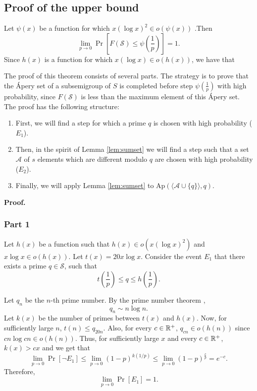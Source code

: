 \subsection{Proof of the upper bound} 
\begin{lemma}\label{lem:upperbound}
    Let $\psi(x)$ be a function for which $x(\log x)^2 \in o(\psi(x))$ .Then
    \[\lim_{p \to 0}\Pr\left[F(\mathcal{S}) \leq \psi\left(\frac{1}{p}\right)\right] = 1.\] 
    Since $h(x)$ is a function for which $x(\log x) \in o(h(x))$, we have that
\end{lemma}

\par The proof of this theorem consists of several parts. The strategy is to prove that the Ápery set of a subsemigroup of $S$ is completed before step $\psi\left(\frac{1}{p}\right)$ with high probability, since $F(\mathcal{S})$ is less than the maximum element of this Ápery set. The proof has the following structure: 
\begin{enumerate}
\item First, we will find a step for which a prime $q$ is chosen with high probability ($E_1$). 
\item Then, in the spirit of Lemma \ref{lem:sumset} we will find a step such that a set $\mathcal{A}$ of $s$ elements which are different modulo $q$ are chosen with high probability ($E_2$). 
\item Finally, we will apply Lemma \ref{lem:sumset} to $\mathrm{Ap}(\langle \mathcal{A} \cup \{q\}\rangle, q)$.
\end{enumerate}
\textbf{Proof. }
\subsubsection*{Part 1} 
Let \(h(x)\) be a function such that \(h(x) \in o(x (\log x)^2)\) and \(x\log x \in o(h(x))\). Let $t(x) = 20x \log x$. Consider the event
$E_1$ that there exists a prime $q \in \mathcal{S}$, such that 
\[t\left(\frac{1}{p}\right) \leq q \leq h\left(\frac{1}{p}\right).\]
\par 
Let $q_n$ be the $n$-th prime number. By the prime number theorem \cite[Theorem 8]{hardy1979introduction}, 
\begin{equation}\label{eq:pnt}
q_n \sim n \log n.
\end{equation}
Let $k(x)$ be the number of primes between $t(x)$ and $h(x)$. Now, for sufficiently large $n$, $t(n) \leq q_{20n}$. Also, for every $c \in \mathbb{R}^+$, $q_{cn} \in o(h(n))$ since $cn\log cn \in o(h(n))$. Thus, for sufficiently large $x$ and every $c \in \mathbb{R}^+$, $k(x) > cx$
and we get that
\[\lim_{p \to 0}\Pr[\lnot E_1] \leq \lim_{p \to 0} (1 - p)^{k(1/p)} \leq \lim_{p \to 0} (1 - p)^{\frac{c}{p}} = e^{-c}.\]
Therefore, 
\begin{equation}\label{eq:upperbound:e1}
    \lim_{p \to 0}\Pr[E_1] = 1.
\end{equation}
